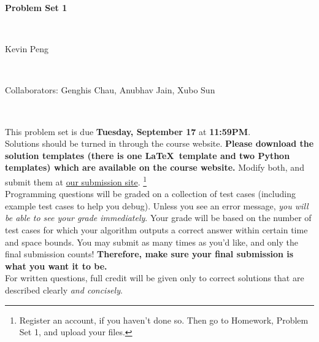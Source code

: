 \documentclass[12pt,twoside]{article}
\newcommand{\theproblemsetnum}{1}
\newcommand{\yourname}{Kevin Peng}
\newcommand{\yourcollaborators}{Genghis Chau, Anubhav Jain, Xubo Sun}
\begin{document}
\begin{center}
\begin{Large} {\bf Problem Set \theproblemsetnum} \end{Large} \vspace{12 pt} \\
\begin{large} \yourname \end{large} \\
\begin{large} Collaborators:  \yourcollaborators \end{large} \\
\end{center}

\hrulefill
\medskip

This problem set is due {\bf Tuesday, September 17} at {\bf 11:59PM}. \\

Solutions should be turned in through the course website.
{\bf Please download the solution templates (there is one \LaTeX\ template and two Python templates) which are available on the course website.}  Modify both, and submit them at \color{blue} \href{https://alg.csail.mit.edu}{our submission site}. \color{black}   \footnote{Register an account, if you haven't done so.  Then go to Homework, Problem Set 1, and upload your files.  } \\

Programming questions will be graded on a collection of test cases
(including example test cases to help you debug). Unless you see an
error message, {\em you will be able to see your grade immediately}.  Your
grade will be based on the number of test cases for which your
algorithm outputs a correct answer within certain time and space
bounds.  You may submit as many times as you'd like, and only the
final submission counts!  {\bf Therefore, make sure your final
  submission is what you want it to be.}\\

For written questions, full credit will be given only to
correct solutions that are described clearly {\em and concisely}. \\

\medskip

\hrulefill

\newpage
\end{document}
